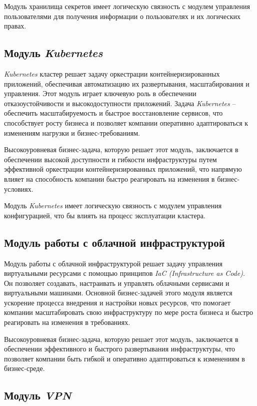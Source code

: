 Модуль хранилища секретов имеет логическую связность с модулем управления пользователями для получения информации о пользователях и их логических правах.

\subsection{Модуль \textit{Kubernetes}} 
\label{sec:kubernetes_cluster}

\textit{Kubernetes} кластер решает задачу оркестрации контейнеризированных приложений, обеспечивая автоматизацию их развертывания, масштабирования и управления. Этот модуль играет ключевую роль в обеспечении отказоустойчивости и высокодоступности приложений. Задача \textit{Kubernetes} -- обеспечить масштабируемость и быстрое восстановление сервисов, что способствует росту бизнеса и позволяет компании оперативно адаптироваться к изменениям нагрузки и бизнес-требованиям.

Высокоуровневая бизнес-задача, которую решает этот модуль, заключается в обеспечении высокой доступности и гибкости инфраструктуры путем эффективной оркестрации контейнеризированных приложений, что напрямую влияет на способность компании быстро реагировать на изменения в бизнес-условиях.

Модуль \textit{Kubernetes} имеет логическую связность с модулем управления конфигурацией, что бы влиять на процесс эксплуатации кластера.

\subsection{Модуль работы с облачной инфраструктурой} 
\label{sec:cloud_infrastructure_module}

Модуль работы с облачной инфраструктурой решает задачу управления виртуальными ресурсами с помощью принципов \textit{IaC (Infrastructure as Code)}. Он позволяет создавать, настраивать и управлять облачными сервисами и виртуальными машинами. Основной бизнес-задачей этого модуля является ускорение процесса внедрения и настройки новых ресурсов, что помогает компании масштабировать свою инфраструктуру по мере роста бизнеса и быстро реагировать на изменения в требованиях.

Высокоуровневая бизнес-задача, которую решает этот модуль, заключается в обеспечении эффективного и быстрого развертывания инфраструктуры, что позволяет компании быть гибкой и оперативно адаптироваться к изменениям в бизнес-среде.

\subsection{Модуль \textit{VPN}} 
\label{sec:vpn_access_module}

